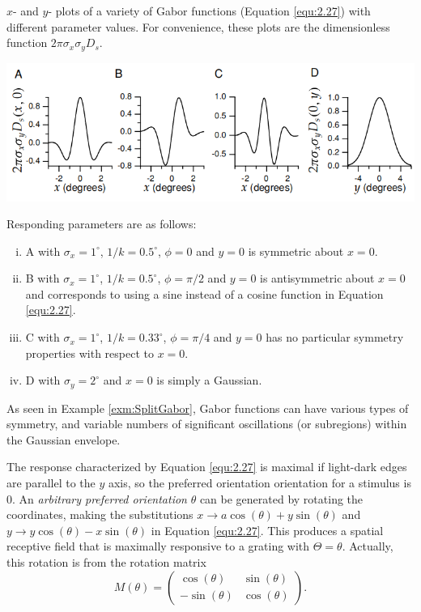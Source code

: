 \begin{exm}
  \label{exm:SplitGabor}
  $x$- and $y$- plots of a variety of Gabor functions (Equation \ref{equ:2.27}) with different parameter values. For convenience, these plots are the dimensionless function $2\pi\sigma_x\sigma_yD_s$.
  \begin{center}
    \includegraphics[scale=0.33]{./png/GaborSplitExm}
  \end{center}
  Responding parameters are as follows:
  \begin{enumerate}[(i)]
  \item A with $\sigma_x = 1^{\circ}$, $1/k = 0.5^{\circ}$, $\phi = 0$ and $y = 0$ is symmetric about $x = 0$.
  \item B with $\sigma_x = 1^{\circ}$, $1/k = 0.5^{\circ}$, $\phi = \pi/2$ and $y = 0$ is antisymmetric about $x = 0$ and corresponds to using a sine instead of a cosine function in Equation \ref{equ:2.27}.
  \item C with $\sigma_x = 1^{\circ}$, $1/k = 0.33^{\circ}$, $\phi = \pi/4$ and $y = 0$ has no particular symmetry properties with respect to $x = 0$.
  \item D with $\sigma_y = 2^{\circ}$ and $x = 0$ is simply a Gaussian.
  \end{enumerate}
\end{exm}

\begin{rem}
  As seen in Example \ref{exm:SplitGabor}, Gabor functions can have various types of symmetry, and variable numbers of significant oscillations (or subregions) within the Gaussian envelope.
\end{rem}

\begin{rem}
  The response characterized by Equation \ref{equ:2.27} is maximal if light-dark edges are parallel to the $y$ axis, so the preferred orientation orientation for a stimulus is 0. An \emph{arbitrary preferred orientation} $\theta$ can be generated by rotating the coordinates, making the substitutions $x \to a\cos(\theta)+y\sin(\theta)$ and $y \to y\cos(\theta)-x\sin(\theta)$ in Equation \ref{equ:2.27}. This produces a spatial receptive field that is maximally responsive to a grating with $\Theta = \theta$. Actually, this rotation is from the rotation matrix
  \begin{displaymath}
    M(\theta) = \left(
      \begin{matrix}
        \cos(\theta) & \sin(\theta)\\
        -\sin(\theta) & \cos(\theta)
      \end{matrix}
    \right).
  \end{displaymath}
\end{rem}

